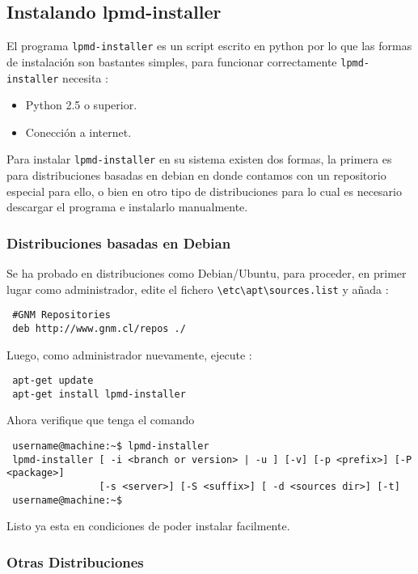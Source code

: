 \subsection{Instalando lpmd-installer}

El programa \verb|lpmd-installer| es un script escrito en python por lo que las formas de instalaci\'on son bastantes simples, para funcionar correctamente \verb|lpmd-installer| necesita :

\begin{itemize}
\item Python 2.5 o superior.
\item Conecci\'on a internet.
\end{itemize}

Para instalar \verb|lpmd-installer| en su sistema existen dos formas, la primera es para distribuciones basadas en debian en donde contamos con un repositorio especial para ello, o bien en otro tipo de distribuciones para lo cual es necesario descargar el programa e instalarlo manualmente.

\subsubsection{Distribuciones basadas en Debian}

Se ha probado en distribuciones como Debian/Ubuntu, para proceder, en primer lugar como administrador, edite el fichero \verb|\etc\apt\sources.list| y a\~nada :

\begin{verbatim}
 #GNM Repositories
 deb http://www.gnm.cl/repos ./
\end{verbatim}

Luego, como administrador nuevamente, ejecute :

\begin{verbatim}
 apt-get update
 apt-get install lpmd-installer
\end{verbatim}

Ahora verifique que tenga el comando
\begin{verbatim}
 username@machine:~$ lpmd-installer 
 lpmd-installer [ -i <branch or version> | -u ] [-v] [-p <prefix>] [-P <package>] 
                [-s <server>] [-S <suffix>] [ -d <sources dir>] [-t]
 username@machine:~$
\end{verbatim}

Listo ya esta en condiciones de poder instalar {\lpmd} facilmente.

\subsubsection{Otras Distribuciones}

